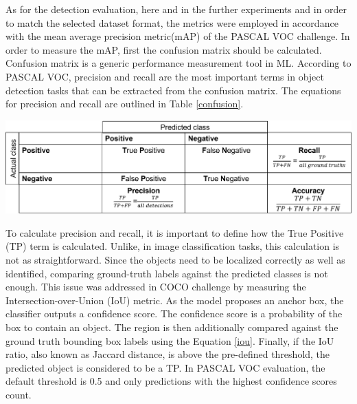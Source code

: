 \documentclass[english, 12pt, a4paper, elec, utf8, a-1b, online]{aaltothesis}
\begin{document}
As for the detection evaluation, here and in the further experiments and in order to match the selected dataset format, the metrics were employed in accordance with the mean average precision metric(mAP) of the PASCAL VOC \cite{Everingham10} challenge. In order to measure the mAP, first the confusion matrix should be calculated. Confusion matrix is a generic performance measurement tool in ML. According to PASCAL VOC, precision and recall are the most important terms in object detection tasks that can be extracted from the confusion matrix. The equations for precision and recall are outlined in Table \ref{confusion}.

\begin{table}[htb]
	\begin{center}
		\includegraphics[width=14cm]{./confusion.png}
	\end{center}
	\begin{center}
		\label{confusion}
	\end{center}
\end{table}
\FloatBarrier


To calculate precision and recall, it is important to define how the True Positive (TP) term is calculated. Unlike, in image classification tasks, this calculation is not as straightforward. Since the objects need to be localized correctly as well as identified, comparing ground-truth labels against the predicted classes is not enough. This issue was addressed in COCO challenge \cite{Lin2014} by measuring the Intersection-over-Union (IoU) metric. As the model proposes an anchor box, the classifier outputs a confidence score. The confidence score is a probability of the box to contain an object. The region is then additionally compared against the ground truth bounding box labels using the Equation \ref{iou}. Finally, if the IoU ratio, also known as Jaccard distance, is above the pre-defined threshold, the predicted object is considered to be a TP. In PASCAL VOC evaluation, the default threshold is 0.5 \cite{mAp_blog} and only predictions with the highest confidence scores count. 
\end{document}
